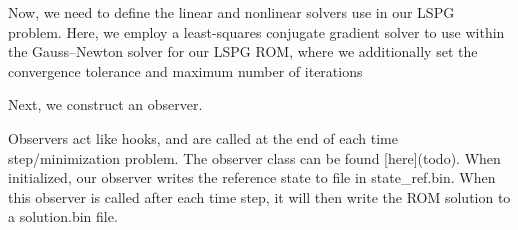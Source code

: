 Now, we need to define the linear and nonlinear solvers use in our LSPG problem. Here, we employ a least-\/squares conjugate gradient solver to use within the Gauss--Newton solver for our LSPG ROM, where we additionally set the convergence tolerance and maximum number of iterations 
\begin{DoxyCode}{0}
\DoxyCodeLine{\textcolor{comment}{// linear solver}}
\DoxyCodeLine{}
\DoxyCodeLine{\textcolor{comment}{// GaussNewton solver with normal equations}}

\end{DoxyCode}


Next, we construct an observer.


\begin{DoxyCode}{0}
\DoxyCodeLine{\textcolor{comment}{// create observer (see rom\_time\_integration\_observer.hpp in parent dir)}}

\end{DoxyCode}
 Observers act like hooks, and are called at the end of each time step/minimization problem. The observer class can be found \mbox{[}here\mbox{]}(todo). When initialized, our observer writes the reference state to file in {\ttfamily state\+\_\+ref.\+bin}. When this observer is called after each time step, it will then write the ROM solution to a {\ttfamily solution.\+bin} file.

